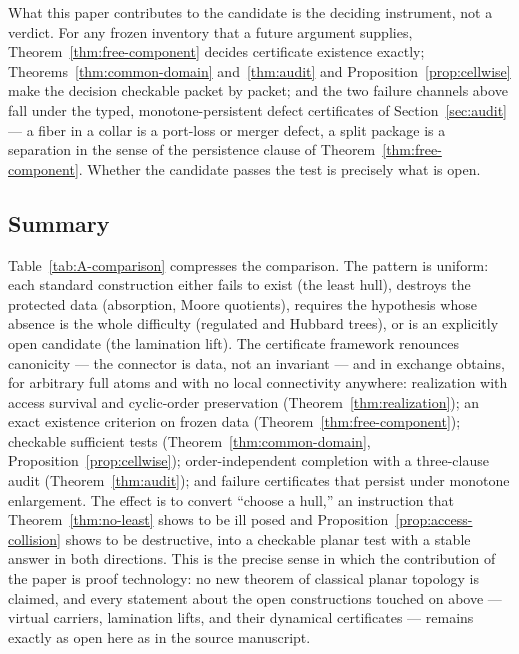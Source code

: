 \documentclass[11pt,reqno]{amsart}
\theoremstyle{definition}
\theoremstyle{remark}
\begin{document}
What this paper contributes to the candidate is the deciding instrument,
not a verdict.  For any frozen inventory that a future argument
supplies, Theorem~\ref{thm:free-component} decides certificate existence
exactly; Theorems~\ref{thm:common-domain} and~\ref{thm:audit} and
Proposition~\ref{prop:cellwise} make the decision checkable packet by
packet; and the two failure channels above fall under the typed,
monotone-persistent defect certificates of Section~\ref{sec:audit} ---
a fiber in a collar is a port-loss or merger defect, a split package is
a separation in the sense of the persistence clause of
Theorem~\ref{thm:free-component}.  Whether the candidate passes the test
is precisely what is open.

\subsection{Summary}
\label{subsec:A-comp-summary}

Table~\ref{tab:A-comparison} compresses the comparison.  The pattern is
uniform: each standard construction either fails to exist (the least
hull), destroys the protected data (absorption, Moore quotients),
requires the hypothesis whose absence is the whole difficulty (regulated
and Hubbard trees), or is an explicitly open candidate (the lamination
lift).  The certificate framework renounces canonicity --- the connector
is data, not an invariant --- and in exchange obtains, for arbitrary
full atoms and with no local connectivity anywhere: realization with
access survival and cyclic-order preservation
(Theorem~\ref{thm:realization}); an exact existence criterion on frozen
data (Theorem~\ref{thm:free-component}); checkable sufficient tests
(Theorem~\ref{thm:common-domain}, Proposition~\ref{prop:cellwise});
order-independent completion with a three-clause audit
(Theorem~\ref{thm:audit}); and failure certificates that persist under
monotone enlargement.  The effect is to convert ``choose a hull,''
an instruction that Theorem~\ref{thm:no-least} shows to be ill posed and
Proposition~\ref{prop:access-collision} shows to be destructive, into a
checkable planar test with a stable answer in both directions.  This is
the precise sense in which the contribution of the paper is proof
technology: no new theorem of classical planar topology is claimed, and
every statement about the open constructions touched on above ---
virtual carriers, lamination lifts, and their dynamical certificates ---
remains exactly as open here as in the source manuscript.
\end{document}

